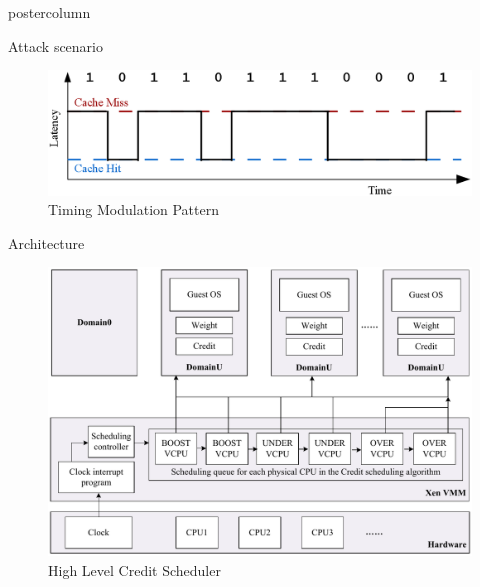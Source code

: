 \documentclass[final,hyperref={pdfpagelabels=false}]{beamer}
\begin{document}
\begin{frame}
\begin{columns}
\begin{column}{.49\textwidth}
\begin{beamercolorbox}[center,wd=\textwidth]{postercolumn}
\begin{minipage}[T]{.95\textwidth}
{\begin{block}{\Large \color{ta2skyblue} Attack scenario}
\begin{figure}
\includegraphics[width=0.9\linewidth]{time_patterns.png}
\caption{\large Timing Modulation Pattern \cite{c3}}
\end{figure}
\end{block}



            
\begin{block}{\Large \color{ta2skyblue} Architecture}

\begin{figure}\vspace{1cm}
\includegraphics[width=1\linewidth]{credit_scheduler}
\caption{\large High Level Credit Scheduler\cite{c2}}
\end{figure}\vspace{1cm}


\end{block}
\vfill
        
          }
        \end{minipage}
      \end{beamercolorbox}
    \end{column}


\end{columns}
\end{frame}
\end{document}
